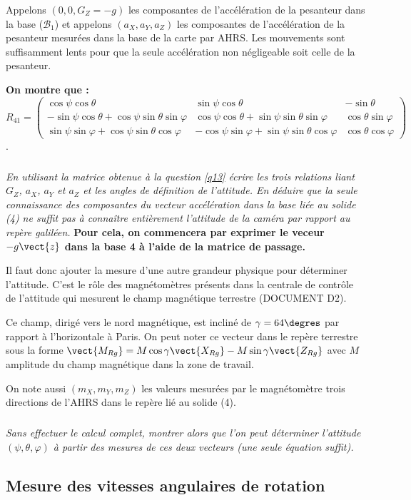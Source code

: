 \documentclass[10pt,fleqn]{article} %
\begin{document}
Appelons $(0, 0, G_Z = -g)$ les composantes de l’accélération de la pesanteur dans la base ($\mathcal{B}_1$) et appelons $(a_X, a_Y, a_Z)$ les composantes de l’accélération de la pesanteur mesurées dans la base de la carte par AHRS. Les mouvements sont suffisamment lents pour que la seule accélération non négligeable soit celle de la pesanteur.


\textbf{On montre que : } $R_{41}=\begin{pmatrix}
\cos\psi \cos\theta & \sin\psi \cos\theta & - \sin \theta \\
-\sin\psi \cos\theta+\cos\psi\sin\theta\sin\varphi & \cos\psi \cos\theta+\sin\psi\sin\theta\sin\varphi &  \cos\theta\sin\varphi \\
\sin\psi \sin\varphi+\cos\psi\sin\theta\cos\varphi & -\cos\psi \sin\varphi+\sin\psi\sin\theta\cos\varphi &  \cos\theta\cos\varphi 
\end{pmatrix}$.
\subparagraph{\label{q14}}\textit{En utilisant la matrice obtenue à la question \ref{q13} écrire les trois relations liant $G_Z$, $a_X$, $a_Y$ et $a_Z$ et les angles de définition de l’attitude. En déduire que la seule connaissance des composantes du vecteur accélération dans la base liée au solide (4) ne suffit pas à connaître entièrement l’attitude de la caméra par rapport au repère galiléen.}
\textbf{Pour cela, on commencera par exprimer le veceur $-g\vect{z}$ dans la base 4 à l'aide de la matrice de passage.}

Il faut donc ajouter la mesure d’une autre grandeur physique pour déterminer l’attitude. C’est le rôle des magnétomètres présents dans la centrale de contrôle de l’attitude qui mesurent le champ magnétique terrestre (DOCUMENT D2). 

Ce champ, dirigé vers le nord magnétique, est incliné de $\gamma=64\degres$ par rapport à l’horizontale à Paris.
On peut noter ce vecteur dans le repère terrestre sous la forme $\vect{M_{Rg}}=M\cos\gamma \vect{X_{Rg}}-M\sin\gamma \vect{Z_{Rg}}$ avec $M$ amplitude du champ magnétique dans la zone de travail. 

On note aussi $(m_X, m_Y, m_Z)$ les valeurs mesurées par le magnétomètre trois directions de l’AHRS dans le repère lié au solide (4).

\subparagraph{\label{q15}}\textit{Sans effectuer le calcul complet, montrer alors que l’on peut déterminer l’attitude $(\psi,\theta,\varphi)$ à partir des mesures de ces deux vecteurs (une seule équation suffit).}


\subsection{Mesure des vitesses angulaires de rotation}
\end{document}
